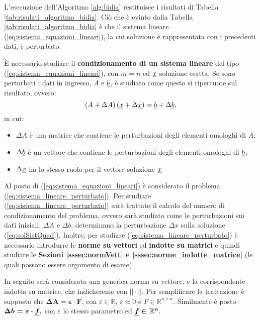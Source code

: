 L'esecuzione dell'Algoritmo \ref{alg:bidia} restituisce i risultati di Tabella \ref{tab:risulati_algoritmo_bidia}. Ciò che è evinto dalla Tabella \ref{tab:risulati_algoritmo_bidia} è che il sistema lineare (\ref{eq:sistema_equazioni_lineari}), la cui soluzione è rappresentata con i precedenti dati, è perturbato.

È necessario studiare il \textbf{condizionamento di un sistema lineare} del tipo (\ref{eq:sistema_equazioni_lineari}), con $m=n$ ed $\uline x$ soluzione esatta. Se sono perturbati i dati in ingresso, $A$ e $\uline b$, è studiato come questo si ripercuote sul risultato, ovvero:
\begin{equation}\label{eq:sistema_lineare_perturbato}
    \left(A+\Delta A\right)\left(\uline x + \Delta\uline x\right) = \uline b +\Delta\uline b,
\end{equation}
in cui:
\begin{itemize}
    \item $\Delta A$ è una matrice che contiene le perturbazioni degli elementi omologhi di $A$;
    \item $\Delta\uline b$ è un vettore che contiene le perturbazioni degli elementi omologhi di $\uline b$;
    \item $\Delta\uline x$ ha lo stesso ruolo per il vettore soluzione $\uline x.$
\end{itemize}

Al posto di (\ref{eq:sistema_equazioni_lineari}) è considerato il problema (\ref{eq:sistema_lineare_perturbato}). Per studiare (\ref{eq:sistema_lineare_perturbato}) sarà trattato il calcolo del numero di condizionamento del problema, ovvero sarà studiato come le perturbazioni sui dati iniziali, $\Delta A$ e $\Delta b$, determinano la perturbazione $\Delta x$ sulla soluzione (\ref{eq:solSistQuad}). Inoltre, per studiare (\ref{eq:sistema_lineare_perturbato}) è necessario introdurre le \textbf{norme su vettori} ed \textbf{indotte su matrici} e quindi studiare le \textbf{Sezioni \ref{sssec:normVett} e \ref{sssec:norme_indotte_matrice}} (le quali possono essere argomento di esame).

In seguito sarà considerata una generica norma su vettore, e la corrispondente indotta su matrice, che indicheremo con $||\cdot||.$ Per semplificare la trattazione è supposto che $\boldsymbol{\Delta A=\varepsilon\cdot F}$, con $\varepsilon\in\mathbb R,\,\varepsilon\approx 0$ e $F\in\mathbb R^{n\times n}.$ Similmente è posto $\boldsymbol{\Delta b = \varepsilon\cdot\uline f},$ con $\varepsilon$ lo stesso parametro ed $\boldsymbol{\uline f\in\mathbb R^n}.$

